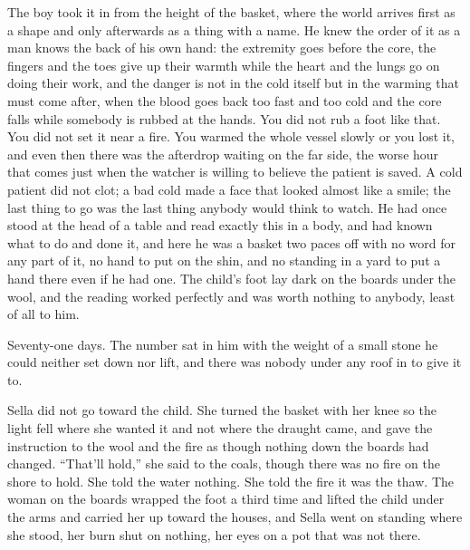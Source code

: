 The boy took it in from the height of the basket, where the world arrives first as a shape and only afterwards as a thing with a name. He knew the order of it as a man knows the back of his own hand: the extremity goes before the core, the fingers and the toes give up their warmth while the heart and the lungs go on doing their work, and the danger is not in the cold itself but in the warming that must come after, when the blood goes back too fast and too cold and the core falls while somebody is rubbed at the hands. You did not rub a foot like that. You did not set it near a fire. You warmed the whole vessel slowly or you lost it, and even then there was the afterdrop waiting on the far side, the worse hour that comes just when the watcher is willing to believe the patient is saved. A cold patient did not clot; a bad cold made a face that looked almost like a smile; the last thing to go was the last thing anybody would think to watch. He had once stood at the head of a table and read exactly this in a body, and had known what to do and done it, and here he was a basket two paces off with no  word for any part of it, no hand to put on the shin, and no standing in a yard to put a hand there even if he had one. The child's foot lay dark on the boards under the wool, and the reading worked perfectly and was worth nothing to anybody, least of all to him.

Seventy-one days. The number sat in him with the weight of a small stone he could neither set down nor lift, and there was nobody under any roof in  to give it to.

\scenebreak

Sella did not go toward the child. She turned the basket with her knee so the light fell where she wanted it and not where the draught came, and gave the instruction to the wool and the fire as though nothing down the boards had changed. “That'll hold,” she said to the coals, though there was no fire on the shore to hold. She told the water nothing. She told the fire it was the thaw. The woman on the boards wrapped the foot a third time and lifted the child under the arms and carried her up toward the houses, and Sella went on standing where she stood, her burn shut on nothing, her eyes on a pot that was not there.

